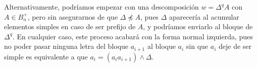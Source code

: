 \documentclass[TFG.tex]{subfiles}
\begin{document}
Alternativamente, podríamos empezar con una descomposición $w=\Delta^qA$ con $A\in B_n^+$, pero sin asegurarnos de que $\Delta \not\preccurlyeq A$, pues $\Delta$ aparecería al acumular elementos simples en caso de ser prefijo de $A$, y podríamos enviarlo al bloque de $\Delta^q$. En cualquier caso, este proceso acabará con la forma normal izquierda, pues no poder pasar ninguna letra del bloque $a_{i+1}$ al bloque $a_i$ sin que $a_i$ deje de ser simple es equivalente a que $a_i=(a_ia_{i+1})\land \Delta$. 

\end{document}
